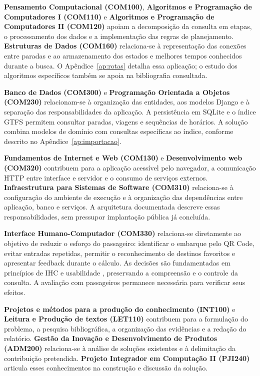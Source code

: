 \documentclass[12pt,oneside,a4paper,brazil,chapter=TITLE]{abntex2}
\begin{document}
\textbf{Pensamento Computacional (COM100)}, \textbf{Algoritmos e Programação de Computadores I (COM110)} e \textbf{Algoritmos e Programação de Computadores II (COM120)} apoiam a decomposição da consulta em etapas, o processamento dos dados e a implementação das regras de planejamento. \textbf{Estruturas de Dados (COM160)} relaciona-se à representação das conexões entre paradas e ao armazenamento dos estados e melhores tempos conhecidos durante a busca. O Apêndice~\ref{ap:rotas} detalha essa aplicação; o estudo dos algoritmos específicos também se apoia na bibliografia consultada.

\textbf{Banco de Dados (COM300)} e \textbf{Programação Orientada a Objetos (COM230)} relacionam-se à organização das entidades, aos modelos Django e à separação das responsabilidades da aplicação. A persistência em SQLite e o índice GTFS permitem consultar paradas, viagens e sequências de horários. A solução combina modelos de domínio com consultas específicas ao índice, conforme descrito no Apêndice~\ref{ap:importacao}.

\textbf{Fundamentos de Internet e Web (COM130)} e \textbf{Desenvolvimento web (COM320)} contribuem para a aplicação acessível pelo navegador, a comunicação HTTP entre interface e servidor e o consumo de serviços externos. \textbf{Infraestrutura para Sistemas de Software (COM310)} relaciona-se à configuração do ambiente de execução e à organização das dependências entre aplicação, banco e serviços. A arquitetura documentada descreve essas responsabilidades, sem pressupor implantação pública já concluída.

\textbf{Interface Humano-Computador (COM330)} relaciona-se diretamente ao objetivo de reduzir o esforço do passageiro: identificar o embarque pelo QR Code, evitar entradas repetidas, permitir o reconhecimento de destinos favoritos e apresentar feedback durante o cálculo. As decisões são fundamentadas em princípios de IHC e usabilidade \citep{barbosa2021,nielsen1994,iso924111}, preservando a compreensão e o controle da consulta. A avaliação com passageiros permanece necessária para verificar seus efeitos.

\textbf{Projetos e métodos para a produção do conhecimento (INT100)} e \textbf{Leitura e Produção de textos (LET110)} contribuem para a formulação do problema, a pesquisa bibliográfica, a organização das evidências e a redação do relatório. \textbf{Gestão da Inovação e Desenvolvimento de Produtos (ADM200)} relaciona-se à análise de soluções existentes e à delimitação da contribuição pretendida. \textbf{Projeto Integrador em Computação II (PJI240)} articula esses conhecimentos na construção e discussão da solução.
\end{document}
